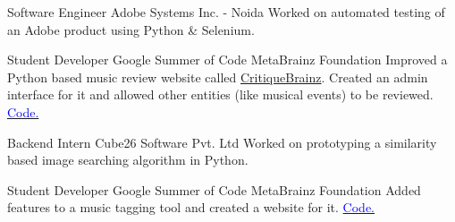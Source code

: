     {Software Engineer}
    {Adobe Systems Inc. - Noida}
    {}
    {}
    {
        Worked on automated testing of an Adobe product using Python \& Selenium.
    }
    \vspace*{0.2\baselineskip}

    {Student Developer}
    {Google Summer of Code}
    {MetaBrainz Foundation}
    {}
    {
        Improved a Python based music review website called \href{http://critiquebrainz.org/}{CritiqueBrainz}.
        Created an admin interface for it
        and allowed other entities (like musical events) to be reviewed.
        \hfill
        \href{https://github.com/metabrainz/critiquebrainz/commits?author=dufferzafar}{\textcolor{blue}{\scriptsize Code.}}
    }
    \vspace*{0.2\baselineskip}

    {Backend Intern}
    {Cube26 Software Pvt. Ltd}
    {}
    {}
    {
        Worked on prototyping a similarity based image searching algorithm in Python.
    }
    \vspace*{0.2\baselineskip}

    {Student Developer}
    {Google Summer of Code}
    {MetaBrainz Foundation}
    {}
    {
        Added features to a music tagging tool and created a website for it.
        \hfill
        \href{https://github.com/metabrainz/picard-website/commits?author=dufferzafar}{\textcolor{blue}{\scriptsize Code.}}
    }
    \vspace*{0.2\baselineskip}

